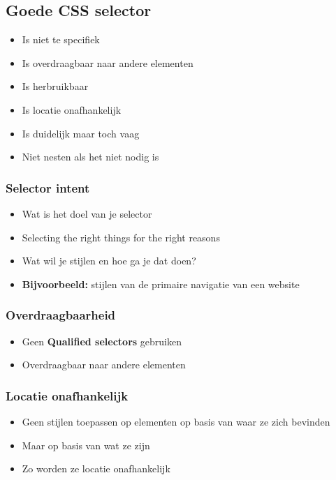 \documentclass{article}
\newcommand{\bold}[1]{\textbf{#1}}
\begin{document}
\subsection{Goede CSS selector}
\begin{itemize}
    \item Is niet te specifiek
    \item Is overdraagbaar naar andere elementen
    \item Is herbruikbaar
    \item Is locatie onafhankelijk
    \item Is duidelijk maar toch vaag
    \item Niet nesten als het niet nodig is
\end{itemize}

\subsubsection{Selector intent}
\begin{itemize}
    \item Wat is het doel van je selector
    \item Selecting the right things for the right reasons
    \item Wat wil je stijlen en hoe ga je dat doen?
    \item \bold{Bijvoorbeeld:} stijlen van de primaire navigatie van een website
\end{itemize}

\subsubsection{Overdraagbaarheid}

\begin{itemize}
    \item Geen \bold{Qualified selectors} gebruiken
    \item Overdraagbaar naar andere elementen
\end{itemize}

\subsubsection{Locatie onafhankelijk}

\begin{itemize}
    \item Geen stijlen toepassen op elementen op basis van waar ze zich bevinden
    \item Maar op basis van wat ze zijn
    \item Zo worden ze locatie onafhankelijk
\end{itemize}
\end{document}
